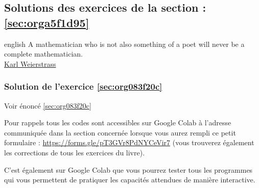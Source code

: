 \documentclass[a4paper, 11pt, twoside]{article}
\begin{document}
\subsection{Solutions des exercices de la section : \ref{sec:orga5f1d95}}
\label{sec:org67c9d9b}

\begin{foreigndisplayquote}{english}
A mathematician who is not also something of a poet will never be a
complete mathematician.\\

\href{https://en.wikipedia.org/wiki/Karl\_Weierstrass}{Karl Weierstrass}
\end{foreigndisplayquote}

\startcontents[level-2]


\subsubsection{Solution de l'exercice \ref{sec:org083f20c}}
\label{sec:orgf6bdc67}
Voir énoncé \ref{sec:org083f20c}

Pour rappels tous les codes sont accessibles sur Google Colab à
l'adresse communiquée dans la section concernée lorsque vous
aurez rempli ce petit formulaire :
\url{https://forms.gle/pT3GVr8PdNYCeVir7} (vous trouverez également
les corrections de tous les exercices du livre).

C'est également sur Google Colab que vous pourrez tester tous les
programmes qui vous permettent de pratiquer les capacités attendues
de manière interactive.
\end{document}
